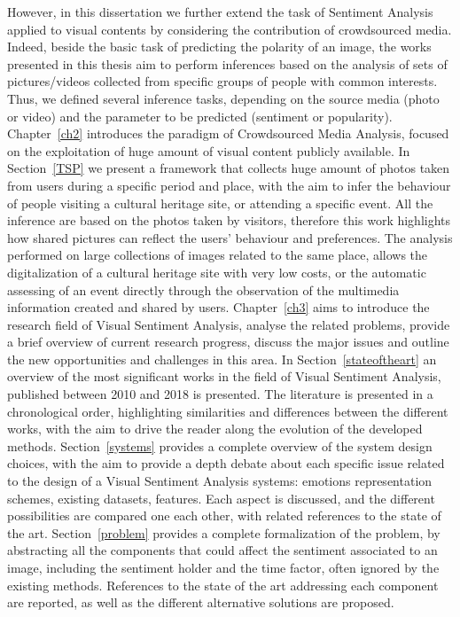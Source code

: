 However, in this dissertation we further extend the task of Sentiment Analysis applied to visual contents by considering the contribution of crowdsourced media. Indeed, beside the basic task of predicting the polarity of an image, the works presented in this thesis aim to perform inferences based on the analysis of sets of pictures/videos collected from specific groups of people with common interests. Thus, we defined several inference tasks, depending on the source media (photo or video) and the parameter to be predicted (sentiment or popularity). 
Chapter~\ref{ch2} introduces the paradigm of Crowdsourced Media Analysis, focused on the exploitation of huge amount of visual content publicly available.
In Section~\ref{TSP} we present a framework that collects huge amount of photos taken from users during a specific period and place, with the aim to infer the behaviour of people visiting a cultural heritage site, or attending a specific event. All the inference are based on the photos taken by visitors, therefore this work highlights how shared pictures can reflect the users' behaviour and preferences. The analysis performed on large collections of images related to the same place, allows the digitalization of a cultural heritage site with very low costs, or the automatic assessing of an event directly through the observation of the multimedia information created and shared by users. 
Chapter~\ref{ch3} aims to introduce the research field of Visual Sentiment Analysis, analyse the related problems, provide a brief overview of current research progress, discuss the major issues and outline the new opportunities and challenges in this area.
In Section~\ref{stateoftheart} an overview of the most significant works in the field of Visual Sentiment Analysis, published between 2010 and 2018 is presented. The literature is presented in a chronological order, highlighting similarities and differences between the different works, with the aim to drive the reader along the evolution of the developed methods.
Section~\ref{systems} provides a complete overview of the system design choices, with the aim to provide a depth debate about each specific issue related to the design of a Visual Sentiment Analysis systems: emotions representation schemes, existing datasets, features. Each aspect is discussed, and the different possibilities are compared one each other, with related references to the state of the art.
Section~\ref{problem} provides a complete formalization of the problem, by abstracting all the components that could affect the sentiment associated to an image, including the sentiment holder and the time factor, often ignored by the existing methods. References to the state of the art addressing each component are reported, as well as the different alternative solutions are proposed.
